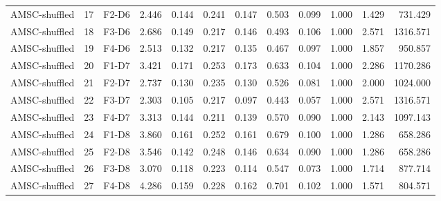 \begin{table}[ht]
\begin{tabular}{lllrrrrrrrrr}
AMSC-shuffled & 17 & F2-D6 & 2.446 & 0.144 & 0.241 & 0.147 & 0.503 & 0.099 & 1.000 & 1.429 & 731.429 \\
AMSC-shuffled & 18 & F3-D6 & 2.686 & 0.149 & 0.217 & 0.146 & 0.493 & 0.106 & 1.000 & 2.571 & 1316.571 \\
AMSC-shuffled & 19 & F4-D6 & 2.513 & 0.132 & 0.217 & 0.135 & 0.467 & 0.097 & 1.000 & 1.857 & 950.857 \\
AMSC-shuffled & 20 & F1-D7 & 3.421 & 0.171 & 0.253 & 0.173 & 0.633 & 0.104 & 1.000 & 2.286 & 1170.286 \\
AMSC-shuffled & 21 & F2-D7 & 2.737 & 0.130 & 0.235 & 0.130 & 0.526 & 0.081 & 1.000 & 2.000 & 1024.000 \\
AMSC-shuffled & 22 & F3-D7 & 2.303 & 0.105 & 0.217 & 0.097 & 0.443 & 0.057 & 1.000 & 2.571 & 1316.571 \\
AMSC-shuffled & 23 & F4-D7 & 3.313 & 0.144 & 0.211 & 0.139 & 0.570 & 0.090 & 1.000 & 2.143 & 1097.143 \\
AMSC-shuffled & 24 & F1-D8 & 3.860 & 0.161 & 0.252 & 0.161 & 0.679 & 0.100 & 1.000 & 1.286 & 658.286 \\
AMSC-shuffled & 25 & F2-D8 & 3.546 & 0.142 & 0.248 & 0.146 & 0.634 & 0.090 & 1.000 & 1.286 & 658.286 \\
AMSC-shuffled & 26 & F3-D8 & 3.070 & 0.118 & 0.223 & 0.114 & 0.547 & 0.073 & 1.000 & 1.714 & 877.714 \\
AMSC-shuffled & 27 & F4-D8 & 4.286 & 0.159 & 0.228 & 0.162 & 0.701 & 0.102 & 1.000 & 1.571 & 804.571 \\
    \bottomrule
    \end{tabular}
\end{table}
